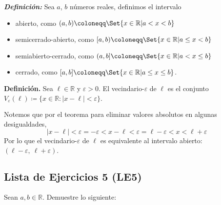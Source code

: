 \documentclass[11pt]{article}
\newcommand{\R}{\mathbb{R}}
\newcommand{\defined}{\coloneqq}
\newcommand{\bfit}[1]{\textbf{\textit{#1}}}
\let\epsilon\varepsilon
\let\set\Set
\begin{document}
\bfit{Definición:}  Sea $a$, $b$ números reales, definimos el intervalo \begin{itemize}
    \item abierto, como $(a,b)\defined \set{x\in \R| a<x<b}$
    \item semicerrado-abierto, como $[a,b)\defined \set{x\in \R|a\leq x <b}$
    \item semiabierto-cerrado, como $(a,b]\defined \set{x\in \R|a<x\leq b}$
    \item cerrado, como $[a,b]\defined \set{x\in \R|a\leq x\leq b}$.
\end{itemize}

\textbf{Definición.} Sea $\ell \in \R$ y $\varepsilon>0$. El vecindario-$\varepsilon$ de $\ell$ es el conjunto $V_\varepsilon(\ell)\defined \{ x\in \R: |x-\ell|<\varepsilon\}$.

Notemos que por el teorema para eliminar valores absolutos en algunas desigualdades, \[|x-\ell| < \epsilon= -\epsilon < x-\ell < \epsilon= \ell-\epsilon < x < \ell+\epsilon\]
Por lo que el vecindario-$\epsilon$ de $\ell$ es equivalente al intervalo abierto: $(\ell-\epsilon, \ \ell+\epsilon)$.

\subsection*{Lista de Ejercicios 5 (LE5)}

Sean $a,b \in \R$. Demuestre lo siguiente:
\end{document}
